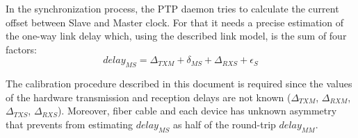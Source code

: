 In the synchronization process, the PTP daemon tries to calculate the current
offset between Slave and Master clock. For that it needs a precise estimation of
the one-way link delay which, using the described link model, is the sum of four
factors:
\begin{equation}
	delay_{MS} = \Delta_{TXM} + \delta_{MS} + \Delta_{RXS} + \epsilon_S
\end{equation}

The calibration procedure described in this document is required since the
values of the hardware transmission and reception delays are not known
($\Delta_{TXM}$, $\Delta_{RXM}$, $\Delta_{TXS}$, $\Delta_{RXS}$). Moreover, 
fiber cable and each device has unknown asymmetry that prevents from estimating 
$delay_{MS}$ as half of the round-trip $delay_{MM}$.
